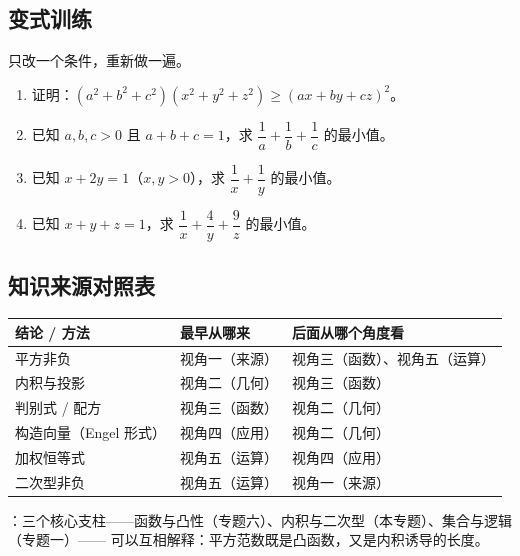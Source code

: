 \begin{inclasstest}
\subsection{变式训练}
只改一个条件，重新做一遍。
\begin{enumerate}
  \item 证明：$(a^2+b^2+c^2)(x^2+y^2+z^2)\geq(ax+by+cz)^2$。
  \item 已知 $a,b,c>0$ 且 $a+b+c=1$，求 $\dfrac1a+\dfrac1b+\dfrac1c$ 的最小值。
  \item 已知 $x+2y=1$（$x,y>0$），求 $\dfrac1x+\dfrac1y$ 的最小值。
  \item 已知 $x+y+z=1$，求 $\dfrac1x+\dfrac4y+\dfrac9z$ 的最小值。
\end{enumerate}
\end{inclasstest}

\begin{afterclass}
\subsection{知识来源对照表}
\begin{center}
\footnotesize
\setlength{\tabcolsep}{4pt}
\renewcommand{\arraystretch}{1.35}
\begin{tabular}{p{3.4cm}p{4.0cm}p{5.6cm}}
\toprule
结论 / 方法 & 最早从哪来 & 后面从哪个角度看 \\
\midrule
平方非负 & 视角一（来源） & 视角三（函数）、视角五（运算） \\
内积与投影 & 视角二（几何） & 视角三（函数） \\
判别式 / 配方 & 视角三（函数） & 视角二（几何） \\
构造向量（Engel 形式） & 视角四（应用） & 视角二（几何） \\
加权恒等式 & 视角五（运算） & 视角四（应用） \\
二次型非负 & 视角五（运算） & 视角一（来源） \\
\bottomrule
\end{tabular}
\end{center}

：三个核心支柱——函数与凸性（专题六）、内积与二次型（本专题）、集合与逻辑（专题一）——
可以互相解释：平方范数既是凸函数，又是内积诱导的长度。
\end{afterclass}
